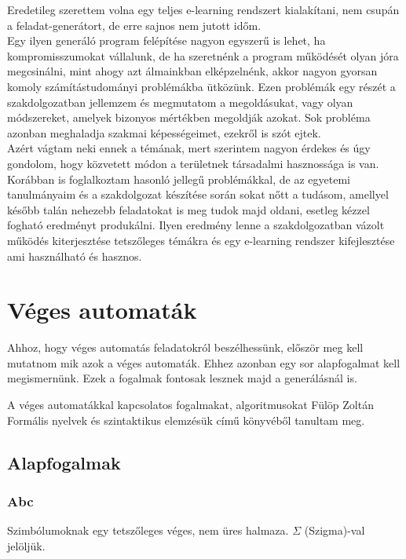 \documentclass[12pt]{report}
\theoremstyle{definition}
\begin{document}
Eredetileg szerettem volna egy teljes e-learning rendszert kialakítani, nem csupán a feladat-generátort, de erre sajnos nem jutott időm.\\

Egy ilyen generáló program felépítése nagyon egyszerű is lehet, ha kompromisszumokat vállalunk, de ha szeretnénk a program működését olyan jóra megcsinálni, mint ahogy azt álmainkban elképzelnénk, akkor nagyon gyorsan komoly számítástudományi problémákba ütközünk. Ezen problémák egy részét a szakdolgozatban jellemzem és megmutatom a megoldásukat, vagy olyan módszereket, amelyek bizonyos mértékben megoldják azokat. Sok probléma azonban meghaladja szakmai képességeimet, ezekről is szót ejtek.\\

Azért vágtam neki ennek a témának, mert szerintem nagyon érdekes és úgy gondolom, hogy közvetett módon a területnek társadalmi hasznossága is van. Korábban is foglalkoztam hasonló jellegű problémákkal, de az egyetemi tanulmányaim és a szakdolgozat készítése során sokat nőtt a tudásom, amellyel később talán nehezebb feladatokat is meg tudok majd oldani, esetleg kézzel fogható eredményt produkálni. Ilyen eredmény lenne a szakdolgozatban vázolt működés kiterjesztése tetszőleges témákra és egy e-learning rendszer kifejlesztése ami használható és hasznos.

\tableofcontents

\chapter{Véges automaták}
Ahhoz, hogy véges automatás feladatokról beszélhessünk, először meg kell mutatnom mik azok a véges automaták. Ehhez azonban egy sor alapfogalmat kell megismernünk. Ezek a fogalmak fontosak lesznek majd a generálásnál is.

A véges automatákkal kapcsolatos fogalmakat, algoritmusokat Fülöp Zoltán Formális nyelvek és szintaktikus elemzésük című könyvéből \cite{Fulop} tanultam meg.

\section{Alapfogalmak}
\subsection{Abc}
Szimbólumoknak egy tetszőleges véges, nem üres halmaza. $\Sigma$ (Szigma)-val jelöljük.
\end{document}
